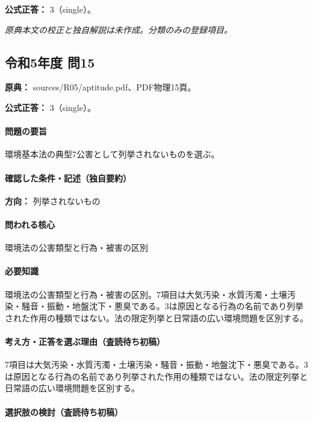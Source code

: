 \textbf{公式正答：} 3（single）。

\par\textit{原典本文の校正と独自解説は未作成。分類のみの登録項目。}

\subsection{令和5年度 問15}
\label{q:r05-reg-apt-15}

\noindent\textbf{原典：} sources/R05/aptitude.pdf、PDF物理15頁。

\textbf{公式正答：} 3（single）。

\paragraph{問題の要旨} 環境基本法の典型7公害として列挙されないものを選ぶ。

\paragraph{確認した条件・記述（独自要約）}\mbox{}\par

\noindent\textbf{方向：} 列挙されないもの\par

\paragraph{問われる核心} 環境法の公害類型と行為・被害の区別

\paragraph{必要知識} 環境法の公害類型と行為・被害の区別。7項目は大気汚染・水質汚濁・土壌汚染・騒音・振動・地盤沈下・悪臭である。3は原因となる行為の名前であり列挙された作用の種類ではない。法の限定列挙と日常語の広い環境問題を区別する。

\paragraph{考え方・正答を選ぶ理由（査読待ち初稿）} 7項目は大気汚染・水質汚濁・土壌汚染・騒音・振動・地盤沈下・悪臭である。3は原因となる行為の名前であり列挙された作用の種類ではない。法の限定列挙と日常語の広い環境問題を区別する。

\paragraph{選択肢の検討（査読待ち初稿）}\mbox{}\par


